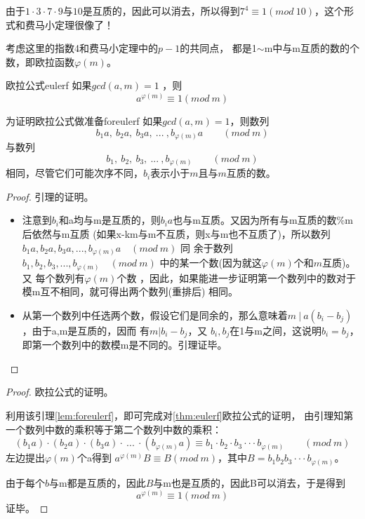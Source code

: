 由于$1\cdot3\cdot7\cdot9$与$10$是互质的，因此可以消去，所以得到$7^4\equiv 1(mod\ 10)$，这个形式和费马小定理很像了！

考虑这里的指数4和费马小定理中的$p-1$的共同点， 都是1$\sim$m中与m互质的数的个数，即欧拉函数$\varphi(m)$。


\begin{theorem}{欧拉公式}{eulerf}
如果$gcd(a,m)=1$ ，则
$$
a^{\varphi(m)}\equiv 1 (mod\ m)
$$
\end{theorem}

\begin{lemma}{为证明欧拉公式做准备}{foreulerf}
如果$gcd(a,m)=1$，则数列
$$
b_1a,\ b_2a,\ b_3a,\ ...\ ,b_{\varphi(m)}a  \qquad  (mod\ m)
$$
与数列
$$
b_1,\ b_2,\ b_3,\ ...\ ,b_{\varphi(m)} \qquad (mod\ m)
$$
相同，尽管它们可能次序不同，$b_i$表示小于$m$且与$m$互质的数。
\end{lemma}

\begin{proof}
引理的证明。
\begin{itemize}
	\item 注意到$b_i$和a均与m是互质的，则$b_ia$也与m互质。{\heiti 又因为所有与m互质的数\%m后依然与m互质} 
	(如果x-km与m不互质，则x与m也不互质了)，所以数列$b_1a,b_2a,b_3a,...,b_{\varphi(m)}a  \quad  (mod\ m)$ 同
	余于数列$b_1,b_2,b_3,...,b_{\varphi(m)} \quad (mod\ m)$ 中的某一个数(因为就这$\varphi(m)$个和$m$互质)。又
	每个数列有$\varphi(m)$个数 ，因此，如果能进一步证明第一个数列中的数对于模m互不相同，就可得出两个数列(重排后)
	相同。  
	\item 从第一个数列中任选两个数，假设它们是同余的，那么意味着$m\ |\ a(b_i-b_j)$，由于a,m是互质的，因而
	有$m|b_i-b_j$，又 $b_i ,b_j$在1与m之间，这说明$b_i=b_j$，即第一个数列中的数模m是不同的。引理证毕。
\end{itemize}
\end{proof}


\begin{proof}
欧拉公式的证明。

利用该引理\ref{lem:foreulerf}，即可完成对\ref{thm:eulerf}欧拉公式的证明，
由引理知第一个数列中数的乘积等于第二个数列中数的乘积：
$$
(b_1a)\cdot (b_2a)\cdot (b_3a)\cdot \ ...\ \cdot (b_{\varphi(m)}a) \equiv b_1\cdot b_2\cdot b_3 \cdot \cdot \cdot b_{\varphi(m)} \qquad  (mod\ m)
$$
左边提出$\varphi(m)$个a得到  $a^{\varphi(m)}B\equiv B (mod\ m)$，其中$B= b_1 b_2 b_3 \cdot \cdot \cdot b_{\varphi(m)} $。

由于每个$b$与m都是互质的，因此$B$与m也是互质的，因此B可以消去，于是得到
$$
a^{\varphi(m)}\equiv 1 (mod\ m)
$$
证毕。
\end{proof}

